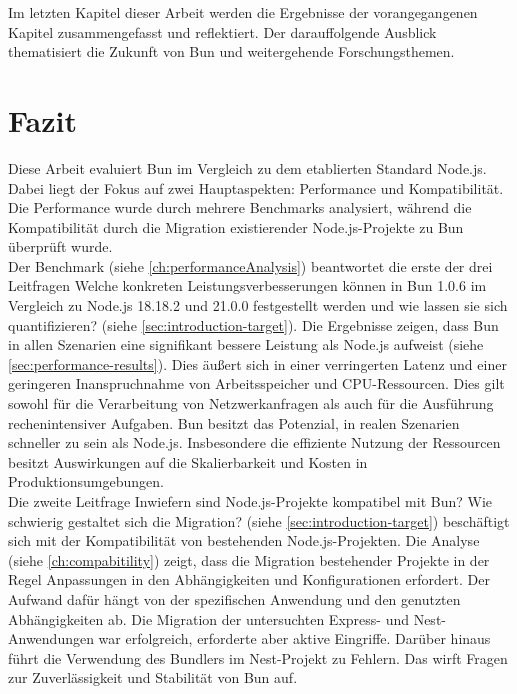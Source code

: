  \label{ch:finalThoughts}
Im letzten Kapitel dieser Arbeit werden die Ergebnisse der vorangegangenen Kapitel zusammengefasst und reflektiert. Der darauffolgende Ausblick thematisiert die Zukunft von Bun und weitergehende Forschungsthemen.

\section{Fazit} \label{sec:finalThoughts-conclusion}
Diese Arbeit evaluiert Bun im Vergleich zu dem etablierten Standard Node.js. Dabei liegt der Fokus auf zwei Hauptaspekten: Performance und Kompatibilität. Die Performance wurde durch mehrere Benchmarks analysiert, während die Kompatibilität durch die Migration existierender Node.js-Projekte zu Bun überprüft wurde.\\

\noindent
Der Benchmark (siehe \autoref{ch:performanceAnalysis}) beantwortet die erste der drei Leitfragen \glqq Welche konkreten Leistungsverbesserungen können in Bun 1.0.6 im Vergleich zu Node.js 18.18.2 und 21.0.0 festgestellt werden und wie lassen sie sich quantifizieren?\grqq{} (siehe \autoref{sec:introduction-target}). Die Ergebnisse zeigen, dass Bun in allen Szenarien eine signifikant bessere Leistung als Node.js aufweist (siehe \autoref{sec:performance-results}). Dies äußert sich in einer verringerten Latenz und einer geringeren Inanspruchnahme von Arbeitsspeicher und CPU-Ressourcen. Dies gilt sowohl für die Verarbeitung von Netzwerkanfragen als auch für die Ausführung rechenintensiver Aufgaben. Bun besitzt das Potenzial, in realen Szenarien schneller zu sein als Node.js. Insbesondere die effiziente Nutzung der Ressourcen besitzt Auswirkungen auf die Skalierbarkeit und Kosten in Produktionsumgebungen.\\

\noindent
Die zweite Leitfrage \glqq Inwiefern sind Node.js-Projekte kompatibel mit Bun? Wie schwierig gestaltet sich die Migration?\grqq{} (siehe \autoref{sec:introduction-target}) beschäftigt sich mit der Kompatibilität von bestehenden Node.js-Projekten. Die Analyse (siehe \autoref{ch:compabitility}) zeigt, dass die Migration bestehender Projekte in der Regel Anpassungen in den Abhängigkeiten und Konfigurationen erfordert. Der Aufwand dafür hängt von der spezifischen Anwendung und den genutzten Abhängigkeiten ab. Die Migration der untersuchten Express- und Nest-Anwendungen war erfolgreich, erforderte aber aktive Eingriffe. Darüber hinaus führt die Verwendung des Bundlers im Nest-Projekt zu Fehlern. Das wirft Fragen zur Zuverlässigkeit und Stabilität von Bun auf.\\

